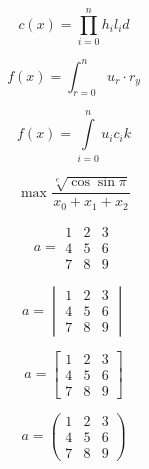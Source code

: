 \documentclass{book}
\begin{document}
    \begin{equation}
        c(x) = \prod_{i = 0}^n h_i l_i d
    \end{equation}

    \begin{equation}
        f(x) = \int_{r = 0}^n u_r \cdot r_y
    \end{equation}

    \begin{equation}
        f(x) = \int\limits_{i = 0}^n u_i c_i k
    \end{equation}

    \begin{equation}
        \max{\frac{\sqrt[e]{\cos \sin \pi}}{x_0 + x_1 + x_ 2}}
    \end{equation}

   \begin{equation}
    a =
        \begin{matrix}
            1 & 2 & 3 \\
            4 & 5 & 6 \\
            7 & 8 & 9
        \end{matrix}
    \end{equation}

    \begin{equation}
        a =
            \begin{vmatrix}
                1 & 2 & 3 \\
                4 & 5 & 6 \\
                7 & 8 & 9
            \end{vmatrix}
    \end{equation}

    \begin{equation}
        a =
            \begin{bmatrix}
                1 & 2 & 3 \\
                4 & 5 & 6 \\
                7 & 8 & 9
            \end{bmatrix}
    \end{equation}

    \begin{equation}
        a =
            \begin{pmatrix}
                1 & 2 & 3 \\
                4 & 5 & 6 \\
                7 & 8 & 9
            \end{pmatrix}
    \end{equation}
\end{document}
